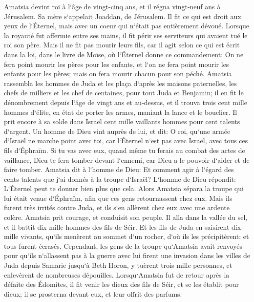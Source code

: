 \verse Amatsia devint roi à l`âge de vingt-cinq ans, et il régna vingt-neuf ans à Jérusalem. Sa mère s`appelait Joaddan, de Jérusalem. 
\verse Il fit ce qui est droit aux yeux de l`Éternel, mais avec un coeur qui n`était pas entièrement dévoué. 
\verse Lorsque la royauté fut affermie entre ses mains, il fit périr ses serviteurs qui avaient tué le roi son père. 
\verse Mais il ne fit pas mourir leurs fils, car il agit selon ce qui est écrit dans la loi, dans le livre de Moïse, où l`Éternel donne ce commandement: On ne fera point mourir les pères pour les enfants, et l`on ne fera point mourir les enfants pour les pères; mais on fera mourir chacun pour son péché. 
\verse Amatsia rassembla les hommes de Juda et les plaça d`après les maisons paternelles, les chefs de milliers et les chef de centaines, pour tout Juda et Benjamin; il en fit le dénombrement depuis l`âge de vingt ans et au-dessus, et il trouva trois cent mille hommes d`élite, en état de porter les armes, maniant la lance et le bouclier. 
\verse Il prit encore à sa solde dans Israël cent mille vaillants hommes pour cent talents d`argent. 
\verse Un homme de Dieu vint auprès de lui, et dit: O roi, qu`une armée d`Israël ne marche point avec toi, car l`Éternel n`est pas avec Israël, avec tous ces fils d`Éphraïm. 
\verse Si tu vas avec eux, quand même tu ferais au combat des actes de vaillance, Dieu te fera tomber devant l`ennemi, car Dieu a le pouvoir d`aider et de faire tomber. 
\verse Amatsia dit à l`homme de Dieu: Et comment agir à l`égard des cents talents que j`ai donnés à la troupe d`Israël? L`homme de Dieu répondit: L`Éternel peut te donner bien plus que cela. 
\verse Alors Amatsia sépara la troupe qui lui était venue d`Éphraïm, afin que ces gens retournassent chez eux. Mais ils furent très irrités contre Juda, et ils s`en allèrent chez eux avec une ardente colère. 
\verse Amatsia prit courage, et conduisit son peuple. Il alla dans la vallée du sel, et il battit dix mille hommes des fils de Séir. 
\verse Et les fils de Juda en saisirent dix mille vivants, qu`ils menèrent au sommet d`un rocher, d`où ils les précipitèrent; et tous furent écrasés. 
\verse Cependant, les gens de la troupe qu`Amatsia avait renvoyés pour qu`ils n`allassent pas à la guerre avec lui firent une invasion dans les villes de Juda depuis Samarie jusqu`à Beth Horon, y tuèrent trois mille personnes, et enlevèrent de nombreuses dépouilles. 
\verse Lorsqu`Amatsia fut de retour après la défaite des Édomites, il fit venir les dieux des fils de Séir, et se les établit pour dieux; il se prosterna devant eux, et leur offrit des parfums. 
